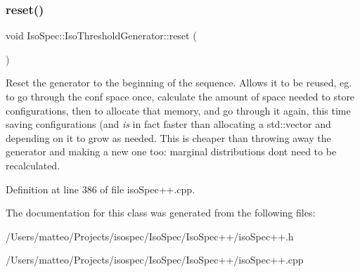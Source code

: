 \subsubsection{\texorpdfstring{reset()}{reset()}}
{\footnotesize\ttfamily void Iso\+Spec\+::\+Iso\+Threshold\+Generator\+::reset (\begin{DoxyParamCaption}{ }\end{DoxyParamCaption})}

Reset the generator to the beginning of the sequence. Allows it to be reused, eg. to go through the conf space once, calculate the amount of space needed to store configurations, then to allocate that memory, and go through it again, this time saving configurations (and {\itshape is} in fact faster than allocating a std\+::vector and depending on it to grow as needed. This is cheaper than throwing away the generator and making a new one too\+: marginal distributions don\textquotesingle{}t need to be recalculated. 

Definition at line 386 of file iso\+Spec++.\+cpp.



The documentation for this class was generated from the following files\+:\begin{DoxyCompactItemize}
\item 
/\+Users/matteo/\+Projects/isospec/\+Iso\+Spec/\+Iso\+Spec++/iso\+Spec++.\+h\item 
/\+Users/matteo/\+Projects/isospec/\+Iso\+Spec/\+Iso\+Spec++/iso\+Spec++.\+cpp\end{DoxyCompactItemize}
